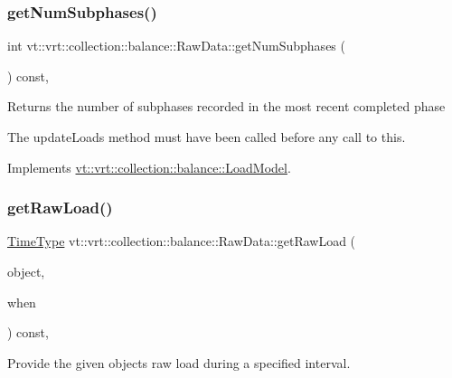 \subsubsection{\texorpdfstring{get\+Num\+Subphases()}{getNumSubphases()}}
{\footnotesize\ttfamily int vt\+::vrt\+::collection\+::balance\+::\+Raw\+Data\+::get\+Num\+Subphases (\begin{DoxyParamCaption}{ }\end{DoxyParamCaption}) const\hspace{0.3cm}{\ttfamily [override]}, {\ttfamily [virtual]}}

Returns the number of subphases recorded in the most recent completed phase

The {\ttfamily update\+Loads} method must have been called before any call to this. 

Implements \hyperlink{structvt_1_1vrt_1_1collection_1_1balance_1_1_load_model_aa7ddeca4fc8de99bc25a895e207de2e6}{vt\+::vrt\+::collection\+::balance\+::\+Load\+Model}.

\mbox{\label{structvt_1_1vrt_1_1collection_1_1balance_1_1_raw_data_af47711d5b5a8ec4fef25282703a4902e}} 
\subsubsection{\texorpdfstring{get\+Raw\+Load()}{getRawLoad()}}
{\footnotesize\ttfamily \hyperlink{namespacevt_a876a9d0cd5a952859c72de8a46881442}{Time\+Type} vt\+::vrt\+::collection\+::balance\+::\+Raw\+Data\+::get\+Raw\+Load (\begin{DoxyParamCaption}\item[{\hyperlink{namespacevt_1_1vrt_1_1collection_1_1balance_a9f5b53fafb270212279a4757d2c4cd28}{Element\+I\+D\+Struct}}]{object,  }\item[{\hyperlink{structvt_1_1vrt_1_1collection_1_1balance_1_1_phase_offset}{Phase\+Offset}}]{when }\end{DoxyParamCaption}) const\hspace{0.3cm}{\ttfamily [override]}, {\ttfamily [virtual]}}



Provide the given object\textquotesingle{}s raw load during a specified interval. 


